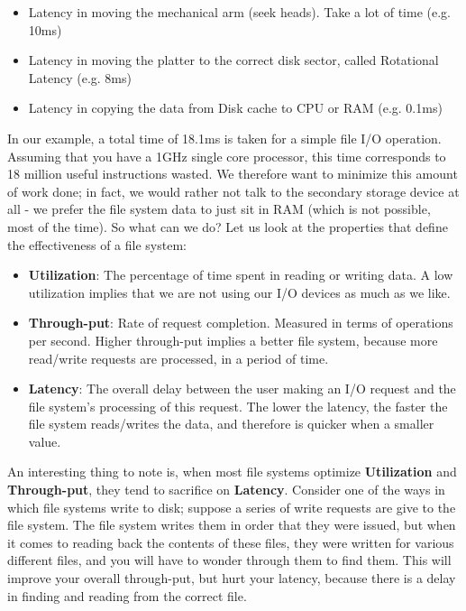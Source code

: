 \documentclass[a4paper]{article}
\begin{document}
\begin{itemize}
\item Latency in moving the mechanical arm (seek heads). Take a lot of  time (e.g. 10ms)
\item Latency in moving the platter to the correct disk sector, called Rotational Latency (e.g. 8ms)
\item Latency in copying the data from Disk cache to CPU or RAM (e.g. 0.1ms)
\end{itemize}

In our example, a total time of 18.1ms is taken for a simple file I/O operation. Assuming that you have a 1GHz single core processor, this time corresponds to 18 million useful instructions wasted. We therefore want to minimize this amount of work done; in fact, we would rather not talk to the secondary storage device at all - we prefer the file system data to just sit in RAM (which is not possible, most of the time). So what can we do? Let us look at the properties that define the effectiveness of a file system:

\begin{itemize}
\item \textbf{Utilization}: The percentage of time spent in reading or writing data. A low utilization implies that we are not using our I/O devices as much as we like. 
\item \textbf{Through-put}: Rate of request completion. Measured in terms of operations per second. Higher through-put implies a better file system, because more read/write requests are processed, in a period of time. 
\item \textbf{Latency}: The overall delay between the user making an I/O request and the file system's processing of this request. The lower the latency, the faster the file system reads/writes the data, and therefore is quicker when a smaller value.
\end{itemize}

An interesting thing to note is, when most file systems optimize \textbf{Utilization} and \textbf{Through-put}, they tend to sacrifice on \textbf{Latency}. Consider one of the ways in which file systems write to disk; suppose a series of write requests are give to the file system. The file system writes them in order that they were issued, but when it comes to reading back the contents of these files, they were written for various different files, and you will have to wonder through them to find them. This will improve your overall through-put, but hurt your latency, because there is a delay in finding and reading from the correct file.
\end{document}
